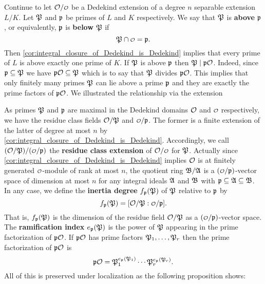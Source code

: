     Continue to let $\mc{O}/\smc{O}$ be a Dedekind extension of a degree $n$ separable extension $L/K$. Let $\mathfrak{P}$ and $\mathfrak{p}$ be primes of $L$ and $K$ respectively. We say that $\mathfrak{P}$ is \textbf{above} $\mathfrak{p}$, or equivalently, $\mathfrak{p}$ is \textbf{below} $\mathfrak{P}$ if
    \[
      \mf{P} \cap \smc{O} = \mf{p}.
    \]
    Then \cref{cor:integral_closure_of_Dedekind_is_Dedekind} implies that every prime of $L$ is above exactly one prime of $K$. If $\mathfrak{P}$ is above $\mathfrak{p}$ then $\mathfrak{P} \mid \mathfrak{p}\mathcal{O}$. Indeed, since $\mathfrak{p} \subseteq \mathfrak{P}$ we have $\mathfrak{p}\mathcal{O} \subseteq \mathfrak{P}$ which is to say that $\mathfrak{P}$ divides $\mathfrak{p}\mathcal{O}$. This implies that only finitely many primes $\mathfrak{P}$ can lie above a prime $\mathfrak{p}$ and they are exactly the prime factors of $\mathfrak{p}\mathcal{O}$. We illustrated the relationship via the extension

    \begin{center}
    \end{center}

    As primes $\mathfrak{P}$ and $\mathfrak{p}$ are maximal in the Dedekind domains $\mathcal{O}$ and $\smc{O}$ respectively, we have the residue class fields $\mathcal{O}/\mathfrak{P}$ and $\smc{O}/\mf{p}$. The former is a finite extension of the latter of degree at most $n$ by \cref{cor:integral_closure_of_Dedekind_is_Dedekind}. Accordingly, we call $(\mc{O}/\mf{P})/(\smc{O}/\mf{p})$ the \textbf{residue class extension} of $\mc{O}/\smc{O}$ for $\mathfrak{P}$. Actually since \cref{cor:integral_closure_of_Dedekind_is_Dedekind} implies $\mathcal{O}$ is at finitely generated $\smc{O}$-module of rank at most $n$, the quotient ring $\mathfrak{B}/\mathfrak{A}$ is a $(\smc{O}/\mf{p})$-vector space of dimension at most $n$ for any integral ideals $\mathfrak{A}$ and $\mathfrak{B}$ with $\mathfrak{p} \subseteq \mathfrak{A} \subseteq \mathfrak{B}$. In any case, we define the \textbf{inertia degree} $f_{\mathfrak{p}}(\mathfrak{P})$ of $\mathfrak{P}$ relative to $\mathfrak{p}$ by
    \[
      f_{\mf{p}}(\mf{P}) = [\mc{O}/\mf{P}:\smc{O}/\mf{p}].
    \]
    That is, $f_{\mathfrak{p}}(\mathfrak{P})$ is the dimension of the residue field $\mathcal{O}/\mathfrak{P}$ as a $(\smc{O}/\mf{p})$-vector space. The \textbf{ramification index} $e_{\mathfrak{p}}(\mathfrak{P})$ is the power of $\mathfrak{P}$ appearing in the prime factorization of $\mathfrak{p}\mathcal{O}$. If $\mathfrak{p}\mathcal{O}$ has prime factors $\mathfrak{P}_{1},\ldots,\mathfrak{P}_{r}$ then the prime factorization of $\mathfrak{p}\mathcal{O}$ is
    \[
      \mathfrak{p}\mathcal{O} = \mathfrak{P}_{1}^{e_{\mathfrak{p}}(\mathfrak{P}_{1})} \cdots \mathfrak{P}_{r}^{e_{\mathfrak{p}}(\mathfrak{P}_{r})}.
    \]
    All of this is preserved under localization as the following proposition shows:

